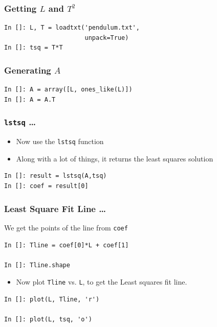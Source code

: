 \documentclass[14pt,compress]{beamer}
\newcommand{\typ}[1]{\lstinline{#1}}
\begin{document}
\begin{frame}[fragile]
\frametitle{Getting $L$ and $T^2$}
\begin{lstlisting}
In []: L, T = loadtxt('pendulum.txt', 
                      unpack=True)
In []: tsq = T*T
\end{lstlisting}
\end{frame}

\begin{frame}[fragile]
\frametitle{Generating $A$}
\begin{lstlisting}
In []: A = array([L, ones_like(L)])
In []: A = A.T
\end{lstlisting}
\end{frame}

\begin{frame}[fragile]
\frametitle{\typ{lstsq} \ldots}
\begin{itemize}
\item Now use the \typ{lstsq} function
\item Along with a lot of things, it returns the least squares solution
\end{itemize}
\begin{lstlisting}
In []: result = lstsq(A,tsq)
In []: coef = result[0]
\end{lstlisting}
\end{frame}

\begin{frame}[fragile]
\frametitle{Least Square Fit Line \ldots}
We get the points of the line from \typ{coef}
\begin{lstlisting}
In []: Tline = coef[0]*L + coef[1]

In []: Tline.shape
\end{lstlisting}
\begin{itemize}
\item Now plot \typ{Tline} vs. \typ{L}, to get the Least squares fit line. 
\end{itemize}
\begin{lstlisting}
In []: plot(L, Tline, 'r')

In []: plot(L, tsq, 'o')
\end{lstlisting}
\end{frame}
\end{document}
